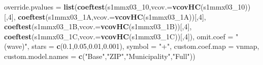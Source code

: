 \documentclass[
]{article}
\newenvironment{Shaded}{\begin{snugshade}}{\end{snugshade}}
\newcommand{\DataTypeTok}[1]{\textcolor[rgb]{0.13,0.29,0.53}{#1}}
\newcommand{\DecValTok}[1]{\textcolor[rgb]{0.00,0.00,0.81}{#1}}
\newcommand{\FloatTok}[1]{\textcolor[rgb]{0.00,0.00,0.81}{#1}}
\newcommand{\KeywordTok}[1]{\textcolor[rgb]{0.13,0.29,0.53}{\textbf{#1}}}
\newcommand{\NormalTok}[1]{#1}
\newcommand{\StringTok}[1]{\textcolor[rgb]{0.31,0.60,0.02}{#1}}
\begin{document}
\begin{Shaded}
\begin{Highlighting}[]
          \DataTypeTok{override.pvalues =} \KeywordTok{list}\NormalTok{(}\KeywordTok{coeftest}\NormalTok{(s1mmx03_}\DecValTok{10}\NormalTok{,}\DataTypeTok{vcov.=}\KeywordTok{vcovHC}\NormalTok{(s1mmx03_}\DecValTok{10}\NormalTok{))[,}\DecValTok{4}\NormalTok{],}
                                  \KeywordTok{coeftest}\NormalTok{(s1mmx03_1A,}\DataTypeTok{vcov.=}\KeywordTok{vcovHC}\NormalTok{(s1mmx03_1A))[,}\DecValTok{4}\NormalTok{],}
                                  \KeywordTok{coeftest}\NormalTok{(s1mmx03_1B,}\DataTypeTok{vcov.=}\KeywordTok{vcovHC}\NormalTok{(s1mmx03_1B))[,}\DecValTok{4}\NormalTok{],}
                                  \KeywordTok{coeftest}\NormalTok{(s1mmx03_1C,}\DataTypeTok{vcov.=}\KeywordTok{vcovHC}\NormalTok{(s1mmx03_1C))[,}\DecValTok{4}\NormalTok{]),}
          \DataTypeTok{omit.coef =} \StringTok{"(wave)"}\NormalTok{, }\DataTypeTok{stars =} \KeywordTok{c}\NormalTok{(}\FloatTok{0.1}\NormalTok{,}\FloatTok{0.05}\NormalTok{,}\FloatTok{0.01}\NormalTok{,}\FloatTok{0.001}\NormalTok{), }\DataTypeTok{symbol =} \StringTok{"+"}\NormalTok{,}
          \DataTypeTok{custom.coef.map =}\NormalTok{ vnmap, }
          \DataTypeTok{custom.model.names =} \KeywordTok{c}\NormalTok{(}\StringTok{"Base"}\NormalTok{,}\StringTok{"ZIP"}\NormalTok{,}\StringTok{"Municipality"}\NormalTok{,}\StringTok{"Full"}\NormalTok{))}
\end{Highlighting}
\end{Shaded}
\end{document}
